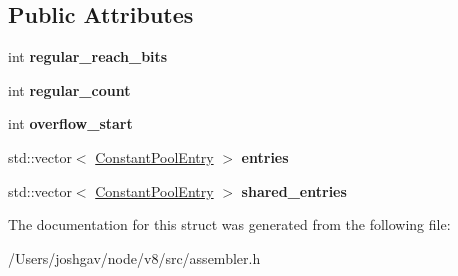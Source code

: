 \subsection*{Public Attributes}
\begin{DoxyCompactItemize}
\item 
int {\bfseries regular\+\_\+reach\+\_\+bits}\hypertarget{structv8_1_1internal_1_1_b_a_s_e___e_m_b_e_d_d_e_d_1_1_per_type_entry_info_ab1fad1cae7c62da9bc519a0b14aa96ba}{}\label{structv8_1_1internal_1_1_b_a_s_e___e_m_b_e_d_d_e_d_1_1_per_type_entry_info_ab1fad1cae7c62da9bc519a0b14aa96ba}

\item 
int {\bfseries regular\+\_\+count}\hypertarget{structv8_1_1internal_1_1_b_a_s_e___e_m_b_e_d_d_e_d_1_1_per_type_entry_info_a0895ccaedae807b92fcf4a86763e5797}{}\label{structv8_1_1internal_1_1_b_a_s_e___e_m_b_e_d_d_e_d_1_1_per_type_entry_info_a0895ccaedae807b92fcf4a86763e5797}

\item 
int {\bfseries overflow\+\_\+start}\hypertarget{structv8_1_1internal_1_1_b_a_s_e___e_m_b_e_d_d_e_d_1_1_per_type_entry_info_a8bcc04b32003703dc37093db4254911e}{}\label{structv8_1_1internal_1_1_b_a_s_e___e_m_b_e_d_d_e_d_1_1_per_type_entry_info_a8bcc04b32003703dc37093db4254911e}

\item 
std\+::vector$<$ \hyperlink{classv8_1_1internal_1_1_constant_pool_entry}{Constant\+Pool\+Entry} $>$ {\bfseries entries}\hypertarget{structv8_1_1internal_1_1_b_a_s_e___e_m_b_e_d_d_e_d_1_1_per_type_entry_info_aa6f99026fafd3afda30482cb843ee609}{}\label{structv8_1_1internal_1_1_b_a_s_e___e_m_b_e_d_d_e_d_1_1_per_type_entry_info_aa6f99026fafd3afda30482cb843ee609}

\item 
std\+::vector$<$ \hyperlink{classv8_1_1internal_1_1_constant_pool_entry}{Constant\+Pool\+Entry} $>$ {\bfseries shared\+\_\+entries}\hypertarget{structv8_1_1internal_1_1_b_a_s_e___e_m_b_e_d_d_e_d_1_1_per_type_entry_info_a8315f170899a366bdece0547d6757826}{}\label{structv8_1_1internal_1_1_b_a_s_e___e_m_b_e_d_d_e_d_1_1_per_type_entry_info_a8315f170899a366bdece0547d6757826}

\end{DoxyCompactItemize}


The documentation for this struct was generated from the following file\+:\begin{DoxyCompactItemize}
\item 
/\+Users/joshgav/node/v8/src/assembler.\+h\end{DoxyCompactItemize}
